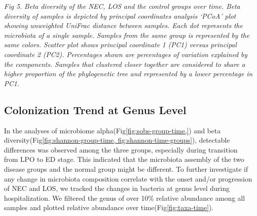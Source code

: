 \documentclass[fleqn,10pt]{wlpeerj} %
\begin{document}
    \emph{Fig 5. Beta diversity of the NEC, LOS and the control groups over time. Beta diversity of samples is depicted by principal coordinates analysis ‘PCoA’ plot showing unweighted UniFrac distance between samples. Each dot represents the microbiota of a single sample.  Samples from the same group is represented by the same colors. Scatter plot shows principal coordinate 1 (PC1) versus principal coordinate 2 (PC2). Percentages shown are percentages of variation explained by the components. Samples that clustered closer together are considered to share a higher proportion of the phylogenetic tree and represented by a lower percentage in PC1.}

  \subsection*{Colonization Trend at Genus Level}
  In the analyses of microbiome alpha(Fig\ref{fig:sobs-group-time,}) and beta diversity(Fig\ref{fig:shannon-group-time, fig:shannon-time-groups}), detectable differences was observed among the three groups, especially during transition from LPO to ED stage.  This indicated that the microbiota assembly of the two disease groups and the normal group might be different.  To further investigate if any change in microbiota composition correlate with the onset and/or progression of NEC and LOS, we tracked the changes in bacteria at genus level during hospitalization.  We filtered the genus of over 10\% relative abundance among all samples and plotted relative abundance over time(Fig\ref{fig:taxa-time}).
\end{document}
